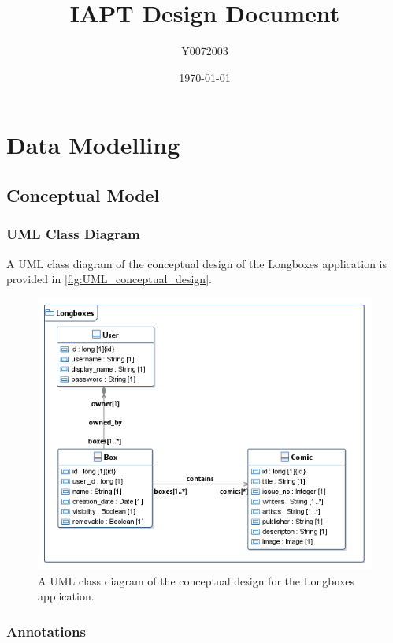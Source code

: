\documentclass{scrreprt}
\title{IAPT Design Document}
\author{Y0072003}
\date{\today}
\begin{document}
\maketitle

\chapter{Data Modelling}

\section{Conceptual Model}

\subsection{UML Class Diagram}

A UML class diagram of the conceptual design of the Longboxes application is provided in \autoref{fig:UML_conceptual_design}.

\begin{figure}[h]
	\begin{center}
		\includegraphics{UML_conceptual_design}
	\end{center}
	\caption{A UML class diagram of the conceptual design for the Longboxes application.}
	\label{fig:UML_conceptual_design}
\end{figure}


\subsection{Annotations}
\end{document}
